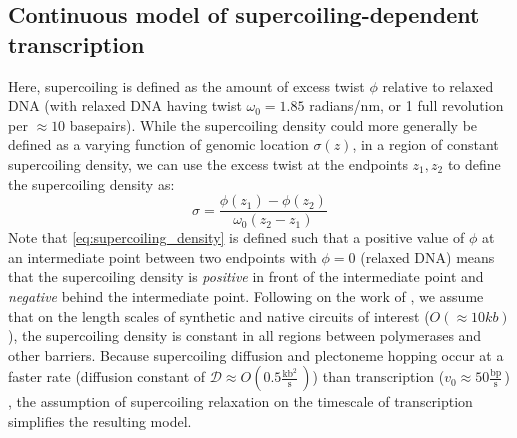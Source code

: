 \documentclass[11pt]{article}
\newcommand{\units}[2]{\frac{\text{#1}}{\text{#2}}\,}
\begin{document}
\subsection{Continuous model of supercoiling-dependent transcription}
Here, supercoiling is defined as the amount of excess twist \(\phi\) relative to relaxed DNA (with relaxed DNA having twist \(\omega_0 = 1.85\) radians/nm, or 1 full revolution per \(\approx10\) basepairs). While the supercoiling density could more generally be defined as a varying function of genomic location \(\sigma(z)\), in a region of constant supercoiling density, we can use the excess twist at the endpoints \(z_1, z_2\) to define the supercoiling density as:
\begin{equation}
    \sigma = \frac{\phi(z_1) - \phi(z_2)}{\omega_0 (z_2 - z_1)}
\label{eq:supercoiling_density}
\end{equation}
Note that \cref{eq:supercoiling_density} is defined such that a positive value of \(\phi\) at an intermediate point between two endpoints with \(\phi=0\) (relaxed DNA) means that the supercoiling density is \emph{positive} in front of the intermediate point and \emph{negative} behind the intermediate point. Following on the work of \textcite{sevierPropertiesGeneExpression2018}, we assume that on the length scales of synthetic and native circuits of interest (\(O(\approx10kb)\)), the supercoiling density is constant in all regions between polymerases and other barriers. Because supercoiling diffusion and plectoneme hopping \parencite{loenhoutDynamicsDNASupercoils2012} occur at a faster rate (diffusion constant of \(\mathcal{D} \approx O(0.5 \units{kb$^2$}{s})\)) than transcription (\(v_0 \approx 50 \units{bp}{s}\)) \parencite{munizRNAPolymeraseII2021}, the assumption of supercoiling relaxation on the timescale of transcription simplifies the resulting model.
\end{document}

